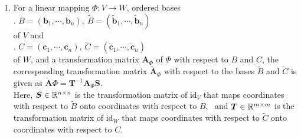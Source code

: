 \begin{enumerate}
    \item
    \begin{theorem}
        For a linear mapping $\Phi : V \to W$, ordered bases
        \hfill \cite{mfml/book/mml/Deisenroth-Faisal-Ong}
        \\
        .\hfill
        $
            B = (\bm{b}_1, \cdots , \bm{b}_n), \ 
            \tilde{B} = (\tilde{\bm{b}}_1, \cdots , \tilde{\bm{b}}_n)
        $
        \hfill \cite{mfml/book/mml/Deisenroth-Faisal-Ong}
        \\
        of $V$ and
        \hfill \cite{mfml/book/mml/Deisenroth-Faisal-Ong}
        \\
        .\hfill
        $
            C = (\bm{c}_1, \cdots , \bm{c}_n), \ 
            \tilde{C} = (\tilde{\bm{c}}_1, \cdots , \tilde{\bm{c}}_n)
        $
        \hfill \cite{mfml/book/mml/Deisenroth-Faisal-Ong}
        \\
        of $W$, and a transformation matrix $\bm{A}_\Phi$ of $\Phi$ with respect to $B$ and $C$, the corresponding transformation matrix $\tilde{\bm{A}} _\Phi$ with respect to the bases $\tilde{B}$ and $\tilde{C}$ is given as
        $
            \tilde{\bm{A}} \Phi = \bm{T}^{-1}\bm{A}_\Phi \bm{S}
        $.
        \hfill \cite{mfml/book/mml/Deisenroth-Faisal-Ong}
        \\
        Here, $\bm{S} \in \mathbb{R}^{n\times n}$ is the transformation matrix of $\text{id}_V$ that maps coordinates with respect to $\tilde{B}$ onto coordinates with respect to $B$, \ 
        and $\bm{T} \in \mathbb{R}^{m\times m}$ is the transformation matrix of $\text{id}_W$ that maps coordinates with respect to $\tilde{C}$ onto coordinates with respect to $C$.
        \hfill \cite{mfml/book/mml/Deisenroth-Faisal-Ong}
    \end{theorem}


\end{enumerate}
